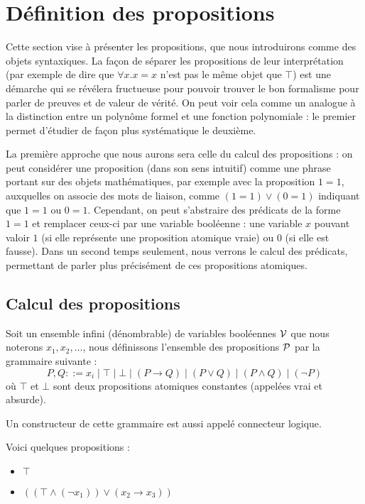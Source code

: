 \section{Définition des propositions}

Cette section vise à présenter les propositions, que nous introduirons comme des objets syntaxiques. La façon de séparer les propositions de leur interprétation (par exemple de dire que $\forall x. x = x$ n'est pas le même objet que $\top$) est une démarche qui se révélera fructueuse pour pouvoir trouver le bon formalisme pour parler de preuves et de valeur de vérité. On peut voir cela comme un analogue à la distinction entre un polynôme formel et une fonction polynomiale : le premier permet d'étudier de façon plus systématique le deuxième.

La première approche que nous aurons sera celle du calcul des propositions : on peut considérer une proposition (dans son sens intuitif) comme une phrase portant sur des objets mathématiques, par exemple avec la proposition $1 = 1$, auxquelles on associe des mots de liaison, comme $(1 = 1) \lor (0 = 1)$ indiquant que $1=1$ ou $0=1$. Cependant, on peut s'abstraire des prédicats de la forme $1=1$ et remplacer ceux-ci par une variable booléenne : une variable $x$ pouvant valoir $1$ (si elle représente une proposition atomique vraie) ou $0$ (si elle est fausse). Dans un second temps seulement, nous verrons le calcul des prédicats, permettant de parler plus précisément de ces propositions atomiques.

\subsection{Calcul des propositions}

\begin{defi}[Proposition]
    Soit un ensemble infini (dénombrable) de variables booléennes $\mathcal V$ que nous noterons $x_1,x_2,\ldots$, nous définissons l'ensemble des propositions $\mathcal P$ par la grammaire suivante : $$ P,Q ::= x_i \mid \top\mid \bot \mid (P\to Q) \mid (P \lor Q) \mid (P\land Q)\mid (\lnot P)$$ où $\top$ et $\bot$ sont deux propositions atomiques constantes (appelées \og vrai\fg{} et \og absurde\fg{}).
\end{defi}

\begin{rmk}
    Un constructeur de cette grammaire est aussi appelé connecteur logique.
\end{rmk}

\begin{expl}
    Voici quelques propositions :
    \begin{itemize}[label=$\bullet$]
        \item $\top$
        \item $((\top \land (\lnot x_1))\lor (x_2\to x_3))$
    \end{itemize}
\end{expl}

